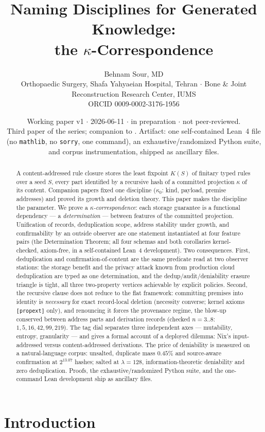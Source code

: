 \documentclass[10pt]{article}
\title{\textbf{Naming Disciplines for Generated Knowledge:\\ the $\kappa$-Correspondence}}
\author{Behnam Sour, MD \\ \small Orthopaedic Surgery, Shafa Yahyaeian Hospital, Tehran $\cdot$ Bone \& Joint Reconstruction Research Center, IUMS \\ \small ORCID 0009-0002-3176-1956}
\date{\small Working paper v1 $\cdot$ 2026-06-11 $\cdot$ in preparation $\cdot$ not peer-reviewed.\\
\small Third paper of the series; companion to \cite{growth,deletion}. Artifact: one self-contained Lean~4 file (no \texttt{mathlib}, no \texttt{sorry}, one command), an exhaustive/randomized Python suite, and corpus instrumentation, shipped as ancillary files.}
\begin{document}
\maketitle

\begin{abstract}
\noindent A content-addressed rule closure stores the least fixpoint $K(S)$ of finitary typed rules over a seed $S$, every part identified by a recursive hash of a committed projection $\kappa$ of its content. Companion papers fixed one discipline ($\kappa_0$: kind, payload, premise addresses) and proved its growth and deletion theory. This paper makes the discipline the parameter. We prove a \emph{$\kappa$-correspondence}: each storage guarantee is a functional dependency --- a \emph{determination} --- between features of the committed projection. Unification of records, deduplication scope, address stability under growth, and confirmability by an outside observer are one statement instantiated at four feature pairs (the Determination Theorem; all four schemas and both corollaries kernel-checked, axiom-free, in a self-contained Lean~4 development). Two consequences. First, deduplication and confirmation-of-content are the same predicate read at two observer stations: the storage benefit and the privacy attack known from production cloud deduplication are typed as one determination, and the dedup/audit/deniability erasure triangle is tight, all three two-property vertices achievable by explicit policies. Second, the recursive clause does not reduce to the flat framework: committing premises into identity is \emph{necessary} for exact record-local deletion (necessity converse; kernel axioms \texttt{[propext]} only), and renouncing it forces the provenance regime, the blow-up conserved between address parts and derivation records (checked $n=3..8$: $1,5,16,42,99,219$). The tag dial separates three independent axes --- mutability, entropy, granularity --- and gives a formal account of a deployed dilemma: Nix's input-addressed versus content-addressed derivations. The price of deniability is measured on a natural-language corpus: unsalted, duplicate mass $0.45\%$ and source-aware confirmation at $2^{13.07}$ hashes; salted at $\lambda{=}128$, information-theoretic deniability and zero deduplication. Proofs, the exhaustive/randomized Python suite, and the one-command Lean development ship as ancillary files.
\end{abstract}

\section{Introduction}\label{sec:intro}
\end{document}
